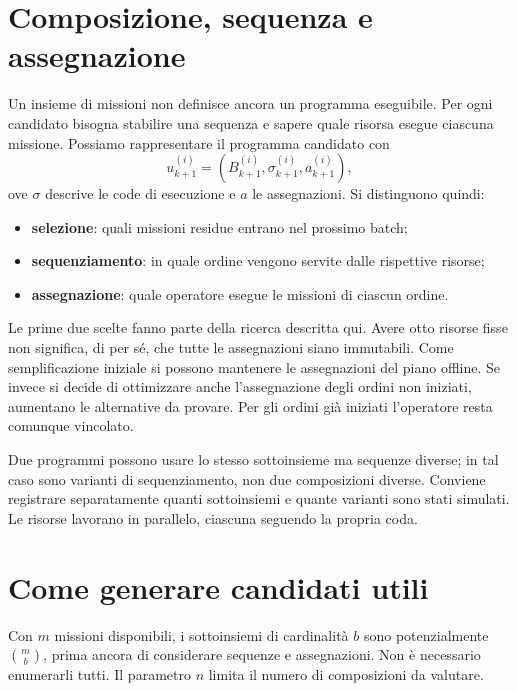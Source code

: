 \documentclass[a4paper,11pt]{article}
\begin{document}
\section{Composizione, sequenza e assegnazione}

Un insieme di missioni non definisce ancora un programma eseguibile. Per ogni candidato bisogna stabilire una sequenza e sapere quale risorsa esegue ciascuna missione. Possiamo rappresentare il programma candidato con
\begin{equation}
    u_{k+1}^{(i)}=(B_{k+1}^{(i)},\sigma_{k+1}^{(i)},a_{k+1}^{(i)}),
\end{equation}
ove $\sigma$ descrive le code di esecuzione e $a$ le assegnazioni. Si distinguono quindi:
\begin{itemize}
    \item \textbf{selezione}: quali missioni residue entrano nel prossimo batch;
    \item \textbf{sequenziamento}: in quale ordine vengono servite dalle rispettive risorse;
    \item \textbf{assegnazione}: quale operatore esegue le missioni di ciascun ordine.
\end{itemize}

Le prime due scelte fanno parte della ricerca descritta qui. Avere otto risorse fisse non significa, di per sé, che tutte le assegnazioni siano immutabili. Come semplificazione iniziale si possono mantenere le assegnazioni del piano offline. Se invece si decide di ottimizzare anche l'assegnazione degli ordini non iniziati, aumentano le alternative da provare. Per gli ordini già iniziati l'operatore resta comunque vincolato.

Due programmi possono usare lo stesso sottoinsieme ma sequenze diverse; in tal caso sono varianti di sequenziamento, non due composizioni diverse. Conviene registrare separatamente quanti sottoinsiemi e quante varianti sono stati simulati. Le risorse lavorano in parallelo, ciascuna seguendo la propria coda.

\section{Come generare candidati utili}

Con $m$ missioni disponibili, i sottoinsiemi di cardinalità $b$ sono potenzialmente $\binom{m}{b}$, prima ancora di considerare sequenze e assegnazioni. Non è necessario enumerarli tutti. Il parametro $n$ limita il numero di composizioni da valutare.
\end{document}
